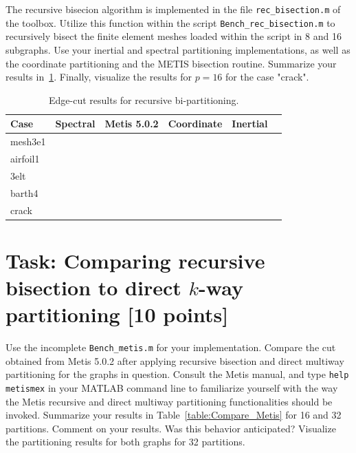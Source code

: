 \documentclass[unicode,11pt,a4paper,oneside,numbers=endperiod,openany]{scrartcl}
\begin{document}
The recursive bisecion algorithm is implemented in the file \texttt{rec\_bisection.m} of the toolbox. Utilize this function within the script \texttt{Bench\_rec\_bisection.m} to recursively bisect the finite element meshes loaded within the script in 8 and 16 subgraphs. Use your inertial and spectral partitioning implementations, as well as the coordinate partitioning and the METIS bisection routine. Summarize your results in~\ref{table:Rec_bisection}. Finally, visualize the results for $p= 16$ for the case "crack".

\begin{table}[h]
\caption{Edge-cut results for recursive bi-partitioning.}
\centering
\begin{tabular}{l|r|r|r|r|r} \hline\hline 
 Case            &  Spectral             &  Metis 5.0.2    & Coordinate & Inertial  \\ \hline
 mesh3e1         &                       &                 &            &           \\             
 airfoil1        &                       &                 &            &           \\ 
 3elt            &                       &                 &            &           \\ 
 barth4          &                       &                 &            &           \\ 
 crack           &                       &                 &            &           \\ \hline \hline
\end{tabular}
\label{table:Rec_bisection}
\end{table}


\section{Task: Comparing recursive bisection to direct $k$-way partitioning [10 points]}

Use the incomplete \texttt{Bench\_metis.m} for your implementation. Compare the cut obtained from Metis 5.0.2 after applying recursive bisection and direct multiway partitioning for the graphs in question. Consult the Metis manual, and type \texttt{help metismex} in your MATLAB command line to familiarize yourself with the way the Metis recursive and direct multiway partitioning functionalities should be invoked. Summarize your results in Table~\ref{table:Compare_Metis} for 16 and 32 partitions. Comment on your results. Was this behavior anticipated? Visualize the partitioning results for both graphs for 32 partitions.
\end{document}
